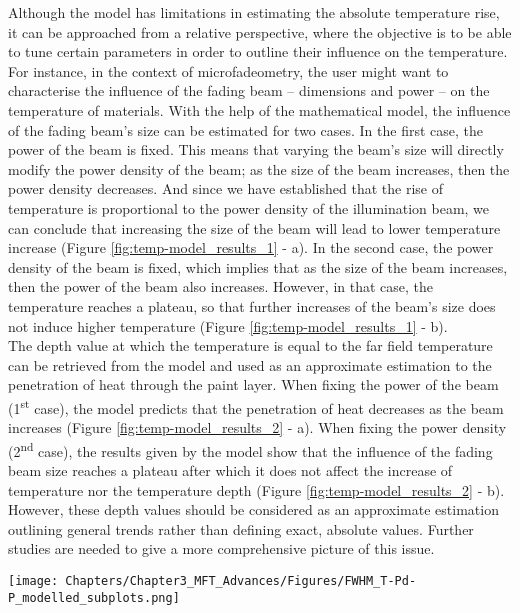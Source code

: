 Although the model has limitations in estimating the absolute temperature rise, it can be approached from a relative perspective, where the objective is to be able to tune certain parameters in order to outline their influence on the temperature. For instance, in the context of microfadeometry, the user might want to characterise the influence of the fading beam – dimensions and power – on the temperature of materials. With the help of the mathematical model, the influence of the fading beam’s size can be estimated for two cases. In the first case, the power of the beam is fixed. This means that varying the beam’s size will directly modify the power density of the beam; as the size of the beam increases, then the power density decreases. And since we have established that the rise of temperature is proportional to the power density of the illumination beam, we can conclude that increasing the size of the beam will lead to lower temperature increase (Figure \ref{fig:temp-model_results_1} - a). In the second case, the power density of the beam is fixed, which implies that as the size of the beam increases, then the power of the beam also increases. However, in that case, the temperature reaches a plateau, so that further increases of the beam’s size does not induce higher temperature (Figure \ref{fig:temp-model_results_1} - b).\\

The depth value at which the temperature is equal to the far field temperature can be retrieved from the model and used as an approximate estimation to the penetration of heat through the paint layer. When fixing the power of the beam (1\textsuperscript{st} case), the model predicts that the penetration of heat decreases as the beam increases (Figure \ref{fig:temp-model_results_2} - a). When fixing the power density (2\textsuperscript{nd} case), the results given by the model show that the influence of the fading beam size reaches a plateau after which it does not affect the increase of temperature nor the temperature depth (Figure \ref{fig:temp-model_results_2} - b). However, these depth values should be considered as an approximate estimation outlining general trends rather than defining exact, absolute values. Further studies are needed to give a more comprehensive picture of this issue. \\

\begin{figure*}
\centering
\texttt{[image: Chapters/Chapter3\_MFT\_Advances/Figures/FWHM\_T-Pd-P\_modelled\_subplots.png]}
\caption[\hspace{0.3cm}Variations of temperature according to the size of the fading beam]{Modelled variations of the temperature according to the size of the fading beam: (a) when the power is fixed and (b) when the power density is fixed.}
\label{fig:temp-model_results_1}
\end{figure*}

